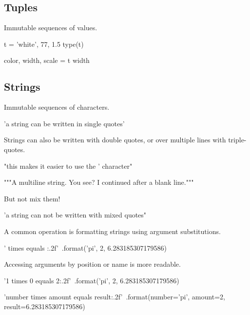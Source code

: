 \documentclass[aspectratio=1610,slidestop]{beamer}
\begin{document}
\subsection{Tuples}
\begin{pframe}
Immutable sequences of values.
\begin{pyconsole}
t = 'white', 77, 1.5
type(t)

color, width, scale = t
width
\end{pyconsole}
\end{pframe}


\subsection{Strings}
\begin{pframe}
Immutable sequences of characters.
\begin{pyconsole}
'a string can be written in single quotes'
\end{pyconsole}
\medskip
\medskip
Strings can also be written with double quotes, or over multiple lines with
triple-quotes.
\begin{pyconsole}
"this makes it easier to use the ' character"
\end{pyconsole}
\medskip
\begin{pyconsole}
"""A multiline string.
You see? I continued after a blank line."""
\end{pyconsole}
\end{pframe}

\begin{pframe}
But not mix them!
\begin{pyconsole}
'a string can not be written with mixed quotes"
\end{pyconsole}
\end{pframe}

\begin{pframe}
\vspace{-0.3cm}
A common operation is formatting strings using argument substitutions.
\begin{pyconsole}
'{} times {} equals {:.2f}'\
    .format('pi', 2, 6.283185307179586)
\end{pyconsole}
\medskip
\medskip
Accessing arguments by position or name is more readable.
\begin{pyconsole}
'{1} times {0} equals {2:.2f}'\
    .format('pi', 2, 6.283185307179586)

'{number} times {amount} equals {result:.2f}'\
    .format(number='pi', amount=2, result=6.283185307179586)
\end{pyconsole}
\end{pframe}
\end{document}
